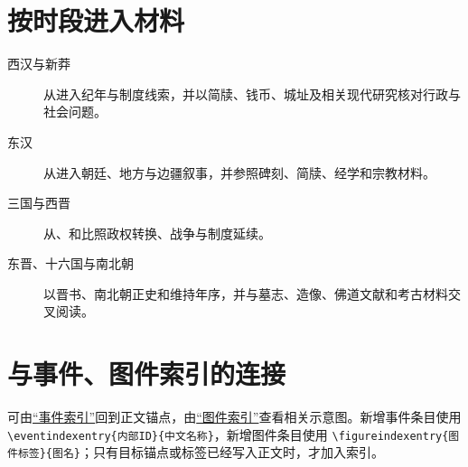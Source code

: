 \section{按时段进入材料}
\label{app:sources:periods}

\begin{description}
  \item[西汉与新莽] 从进入纪年与制度线索，并以简牍、钱币、城址及相关现代研究核对行政与社会问题。
  \item[东汉] 从进入朝廷、地方与边疆叙事，并参照碑刻、简牍、经学和宗教材料。
  \item[三国与西晋] 从、和比照政权转换、战争与制度延续。
  \item[东晋、十六国与南北朝] 以晋书、南北朝正史和维持年序，并与墓志、造像、佛道文献和考古材料交叉阅读。
\end{description}

\section{与事件、图件索引的连接}
\label{app:sources:links}

可由\hyperref[app:index:events]{“事件索引”}回到正文锚点，由\hyperref[app:index:figures]{“图件索引”}查看相关示意图。新增事件条目使用 \verb|\eventindexentry{内部ID}{中文名称}|，新增图件条目使用 \verb|\figureindexentry{图件标签}{图名}|；只有目标锚点或标签已经写入正文时，才加入索引。
